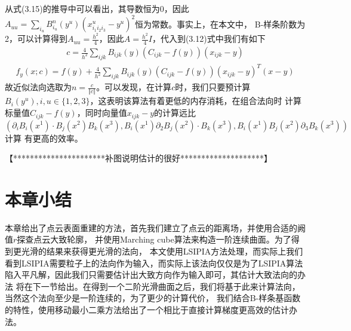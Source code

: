 从式(3.15)的推导中可以看出，其导数恒为0，因此$A_{uu} = \sum_{i_u} B_{i_u}^n(y^u) (x_{i_1 i_2 i_3}^u - y^u)^2$恒为常数。事实上，在本文中，
B-样条阶数为2，可以计算得到$A_{uu} = \frac{h^2}{4}$，因此$A = \frac{h^2}{4}I$，代入到(3.12)式中我们有如下
\begin{equation}
    \begin{split}
        c = \frac{4}{h^2}\sum_{ijk}B_{ijk}(y)(C_{ijk} - f(y))(x_{ijk} - y)
    \end{split}
\end{equation}
\begin{equation}
    \begin{split}
        f_y(x;c) = f(y) + \frac{4}{h^2}\sum_{ijk}B_{ijk}(y)(C_{ijk} - f(y))(x_{ijk} - y)^T(x - y)
    \end{split}
\end{equation}
故近似法向选取为$n = \frac{c}{\Vert c\Vert}$。可以发现，在计算$c$时，我们只要预计算$B_{i}(y^u), i,u \in \{1,2,3\}$，这表明该算法有着更低的内存消耗，在组合法向时
计算标量值$C_{ijk} - f(y)$，同时向量值$x_{ijk} - y$的计算远比$(\partial_i B_i(x^1) \cdot B_j(x^2)B_k(x^3), B_i(x^1)\partial_2 B_j(x^2)\cdot B_k(x^3), B_i(x^1)B_j(x^2)\partial_3B_k(x^3))$计算
有更高的效率。

【**********************补图说明估计的很好********************】
\section{本章小结}
本章给出了点云表面重建的方法，首先我们建立了点云的距离场，并使用合适的阙值$r$探查点云大致轮廓，
并使用Marching cube算法来构造一阶连续曲面。为了得到更光滑的结果来获得更光滑的法向，
本文使用LSIPIA方法处理，而实际上我们看到LSIPIA需要粒子上的法向作为输入，而实际上该法向仅仅是为了LSIPIA算法
陷入平凡解，因此我们只需要估计出大致方向作为输入即可，其估计大致法向的办法
将在下一节给出。在得到一个二阶光滑曲面之后，我们将基于此来计算法向，当然这个法向至少是一阶连续的，为了更少的计算代价，
我们结合B-样条基函数的特性，使用移动最小二乘方法给出了一个相比于直接计算梯度更高效的估计办法。




